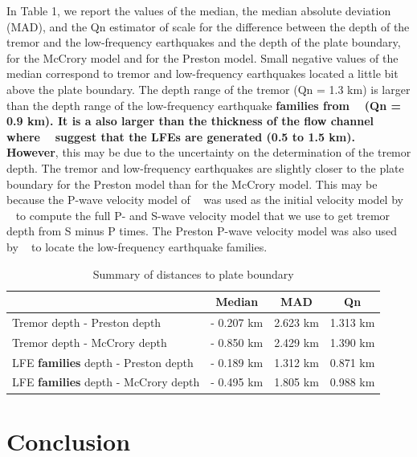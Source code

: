 \documentclass[draft]{agujournal2019}
\begin{document}
In Table 1, we report the values of the median, the median absolute deviation (MAD), and the Qn estimator of scale for the difference between the depth of the tremor and the low-frequency earthquakes and the depth of the plate boundary, for the McCrory model and for the Preston model. Small negative values of the median correspond to tremor and low-frequency earthquakes located a little bit above the plate boundary. The depth range of the tremor (Qn = 1.3 km) is larger than the depth range of the low-frequency earthquake \textbf{families from ~ (Qn = 0.9 km). It is a also larger than the thickness of the flow channel where ~ suggest that the LFEs are generated (0.5 to 1.5 km). However}, this may be due to the uncertainty on the determination of the tremor depth. The tremor and low-frequency earthquakes are slightly closer to the plate boundary for the Preston model than for the McCrory model. This may be because the P-wave velocity model of ~ was used as the initial velocity model by ~ to compute the full P- and S-wave velocity model that we use to get tremor depth from S minus P times. The Preston P-wave velocity model was also used by ~ to locate the low-frequency earthquake families. \\

\begin{table}
\caption{Summary of distances to plate boundary}
\centering
\begin{tabular}{l c c c}
\hline
 & Median & MAD & Qn \\ 
\hline
Tremor depth - Preston depth & - 0.207 km & 2.623 km & 1.313 km \\
Tremor depth - McCrory depth & - 0.850 km & 2.429 km & 1.390 km \\
LFE \textbf{families} depth - Preston depth & - 0.189 km & 1.312 km & 0.871 km \\
LFE \textbf{families} depth - McCrory depth & - 0.495 km & 1.805 km & 0.988 km \\
\hline
\end{tabular}
\end{table}

\section{Conclusion}
\end{document}
